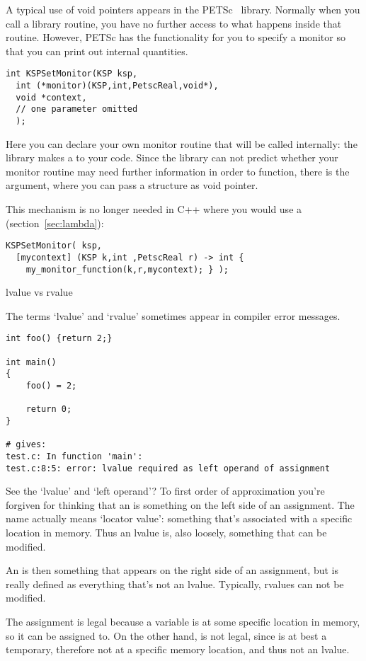 A typical use of void pointers appears in the
PETSc~\cite{petsc-efficient,petsc-home-page} library. Normally when
you call a library routine, you have no further access to what happens
inside that routine. However, PETSc has the functionality for you to
specify a monitor so that you can print out internal quantities.
\begin{lstlisting}
int KSPSetMonitor(KSP ksp,
  int (*monitor)(KSP,int,PetscReal,void*),
  void *context,
  // one parameter omitted
  );
\end{lstlisting}
Here you can declare your own monitor routine that will be called
internally: the library makes a  to your code.
Since the library can not predict whether your monitor routine may
need further information in order to function, there is the
 argument, where you can pass a structure as void pointer.

This mechanism is no longer needed in C++ where you would use a
 (section~\ref{sec:lambda}):
\begin{lstlisting}
KSPSetMonitor( ksp,
  [mycontext] (KSP k,int ,PetscReal r) -> int {
    my_monitor_function(k,r,mycontext); } );
\end{lstlisting}


 {lvalue vs rvalue}
\label{sec:lrvalue}

The terms `lvalue' and `rvalue' sometimes appear in compiler error
messages.
\begin{lstlisting}
int foo() {return 2;}

int main()
{
    foo() = 2;

    return 0;
}

# gives:
test.c: In function 'main':
test.c:8:5: error: lvalue required as left operand of assignment
\end{lstlisting}

See the `lvalue' and `left operand'? To first order of approximation
you're forgiven for thinking that an  is something
on the left side of an assignment. The name actually means `locator
value': something that's associated with a specific location in
memory. Thus an lvalue is, also loosely, something that can be modified.

An  is then something that appears on the right
side of an assignment, but is really defined as everything that's not
an lvalue. Typically, rvalues can not be modified.

The assignment  is legal because a variable  is at some specific
location in memory, so it can be assigned to. On the other hand,
 is not legal, since  is at best a temporary,
therefore not at a specific memory location, and thus not an lvalue.

